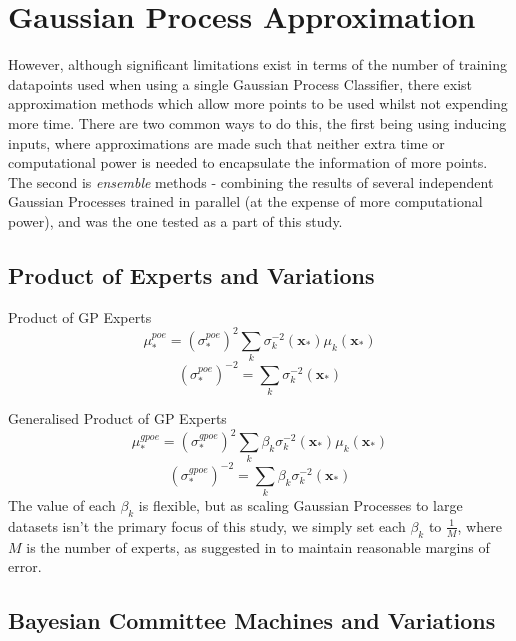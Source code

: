 \section{Gaussian Process Approximation}

However, although significant limitations exist in terms of the number of training datapoints used when using a single Gaussian Process Classifier, there exist approximation methods which allow more points to be used whilst not expending more time. There are two common ways to do this, the first being using inducing inputs, where approximations are made such that neither extra time or computational power is needed to encapsulate the information of more points. The second is \textit{ensemble} methods - combining the results of several independent Gaussian Processes trained in parallel (at the expense of more computational power), and was the one tested as a part of this study.

\subsection{Product of Experts and Variations}

Product of GP Experts
\begin{equation}
    \mu_*^{poe} = (\sigma_*^{poe})^2 \sum_k \sigma_k^{-2} (\mathbf{x_*}) \mu_k (\mathbf{x_*})
\end{equation}
\begin{equation}
    (\sigma_*^{poe})^{-2} = \sum_k \sigma_k^{-2} (\mathbf{x_*})
\end{equation}

Generalised Product of GP Experts
\begin{equation}
    \mu_*^{gpoe} = (\sigma_*^{gpoe})^2 \sum_k \beta_k \sigma_k^{-2} (\mathbf{x_*}) \mu_k (\mathbf{x_*})
\end{equation}
\begin{equation}
    (\sigma_*^{gpoe})^{-2} = \sum_k \beta_k \sigma_k^{-2} (\mathbf{x_*})
\end{equation}
The value of each $\beta_k$ is flexible, but as scaling Gaussian Processes to large datasets isn't the primary focus of this study, we simply set each $\beta_k$ to $\frac{1}{M}$, where $M$ is the number of experts, as suggested in \citep{deisenroth15} to maintain reasonable margins of error.

\subsection{Bayesian Committee Machines and Variations}

